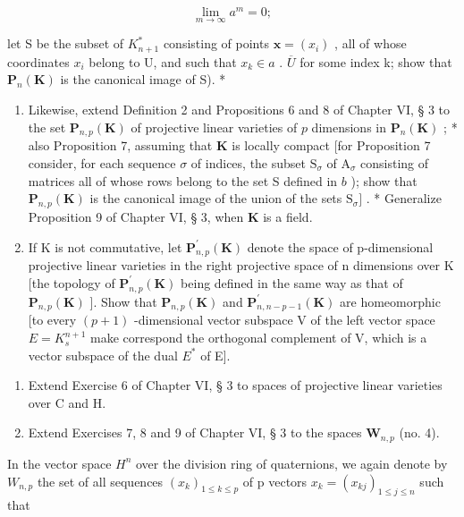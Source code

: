 \[
\lim _ {m \rightarrow \infty} a ^ {m} = 0;
\]

let S be the subset of \(K_{n+1}^{*}\) consisting of points \(\boldsymbol{x} = (x_{i})\) , all of whose coordinates \(x_{i}\) belong to U, and such that \(x_{k} \in a\) . \(\overline{U}\) for some index k; show that \(\mathbf{P}_{n}(\mathbf{K})\) is the canonical image of S). *

\begin{enumerate}
\def\labelenumi{\alph{enumi})}
\setcounter{enumi}{2}
\item
  Likewise, extend Definition 2 and Propositions 6 and 8 of Chapter VI, § 3 to the set \(\mathbf{P}_{n,p}(\mathbf{K})\) of projective linear varieties of \(p\) dimensions in \(\mathbf{P}_n(\mathbf{K})\) ; * also Proposition 7, assuming that \(\mathbf{K}\) is locally compact {[}for Proposition 7 consider, for each sequence \(\sigma\) of indices, the subset \(\mathrm{S}_{\sigma}\) of \(\mathrm{A}_{\sigma}\) consisting of matrices all of whose rows belong to the set S defined in \(b\) ); show that \(\mathbf{P}_{n,p}(\mathbf{K})\) is the canonical image of the union of the sets \(\mathrm{S}_{\sigma}]\) . * Generalize Proposition 9 of Chapter VI, § 3, when \(\mathbf{K}\) is a field.
\item
  If K is not commutative, let \(\mathbf{P}_{n,p}^{\prime}(\mathbf{K})\) denote the space of p-dimensional projective linear varieties in the right projective space of n dimensions over K {[}the topology of \(\mathbf{P}_{n,p}^{\prime}(\mathbf{K})\) being defined in the same way as that of \(\mathbf{P}_{n,p}(\mathbf{K})\) {]}. Show that \(\mathbf{P}_{n,p}(\mathbf{K})\) and \(\mathbf{P}_{n,n-p-1}^{\prime}(\mathbf{K})\) are homeomorphic {[}to every \((p+1)\) -dimensional vector subspace V of the left vector space \(E=K_{s}^{n+1}\) make correspond the orthogonal complement of V, which is a vector subspace of the dual \(E^{*}\) of E{]}.
\end{enumerate}

\begin{enumerate}
\def\labelenumi{\arabic{enumi})}
\setcounter{enumi}{6}
\item
  Extend Exercise 6 of Chapter VI, § 3 to spaces of projective linear varieties over C and H.
\item
  Extend Exercises 7, 8 and 9 of Chapter VI, § 3 to the spaces \(\mathbf{W}_{n,p}\) (no. 4).
\end{enumerate}

In the vector space \(H^{n}\) over the division ring of quaternions, we again denote by \(W_{n,p}\) the set of all sequences \((x_{k})_{1\leqslant k\leqslant p}\) of p vectors \(x_{k}=(x_{kj})_{1\leqslant j\leqslant n}\) such that

